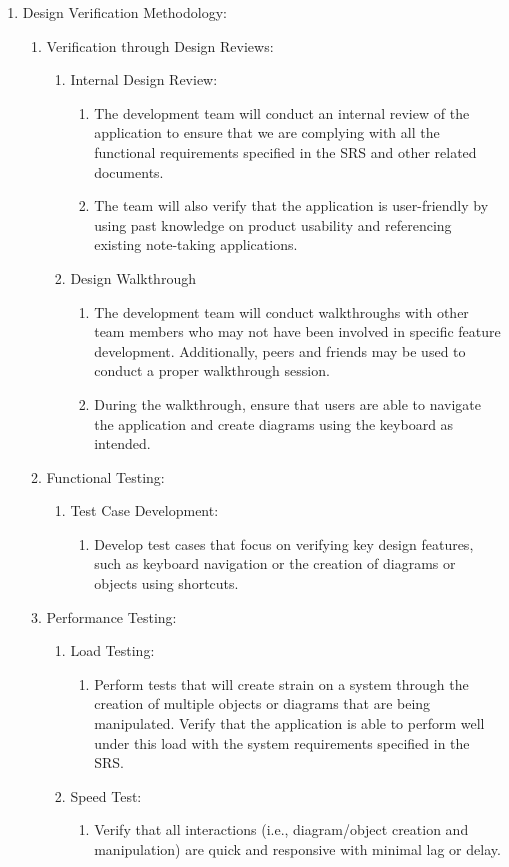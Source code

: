 \documentclass[12pt, titlepage]{article}
\begin{document}
\begin{enumerate}
\item Design Verification Methodology:
\begin{enumerate}
\item Verification through Design Reviews:
\begin{enumerate}
\item Internal Design Review:
\begin{enumerate}
\item The development team will conduct an internal
review of the application to ensure that we are
complying with all the functional requirements
specified in the SRS and other related documents.
\item The team will also verify that the
application is user-friendly by using past knowledge
on product usability and referencing
existing note-taking applications.
\end{enumerate}
\item Design Walkthrough
\begin{enumerate}
\item The development team will conduct walkthroughs
with other team members who may not have been involved
in specific feature development. Additionally,
peers and friends may be used to conduct a proper
walkthrough session.
\item During the walkthrough, ensure that users
are able to navigate the application and create
diagrams using the keyboard as intended.
\end{enumerate}
\end{enumerate}

\item Functional Testing:
\begin{enumerate}
\item Test Case Development:
\begin{enumerate}
\item Develop test cases that focus on verifying key
design features, such as keyboard navigation or
the creation of diagrams or objects using shortcuts.
\end{enumerate}
\end{enumerate}

\item Performance Testing:
\begin{enumerate}
\item Load Testing:
\begin{enumerate}
\item Perform tests that will create strain on a system
through the creation of multiple objects or diagrams
that are being manipulated. Verify that the application
is able to perform well under this load with the
system requirements specified in the SRS.
\end{enumerate}
\item Speed Test:
\begin{enumerate}
\item Verify that all interactions (i.e.,
diagram/object creation and manipulation) are
quick and responsive with minimal lag or delay.
\end{enumerate}
\end{enumerate}
\end{enumerate}


\end{enumerate}
\end{document}
